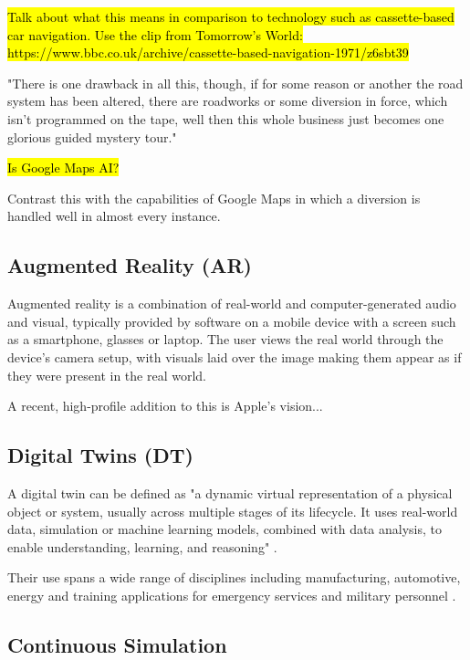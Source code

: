 \documentclass{article}
\begin{document}
\hl{Talk about what this means in comparison to technology such as cassette-based car navigation. Use the clip from Tomorrow's World: https://www.bbc.co.uk/archive/cassette-based-navigation-1971/z6sbt39}

"There is one drawback in all this, though, if for some reason or another the road system has been altered, there are roadworks or some diversion in force, which isn't programmed on the tape, well then this whole business just becomes one glorious guided mystery tour."

\hl{Is Google Maps AI?}

Contrast this with the capabilities of Google Maps in which a diversion is handled well in almost every instance.

\subsection{Augmented Reality (AR)}

Augmented reality is a combination of real-world and computer-generated audio and visual, typically provided by software on a mobile device with a screen such as a smartphone, glasses or laptop. The user views the real world through the device's camera setup, with visuals laid over the image making them appear as if they were present in the real world.

A recent, high-profile addition to this is Apple's vision...


\subsection{Digital Twins (DT)}

A digital twin can be defined as "a dynamic virtual representation of a physical object or system, usually across multiple stages of its lifecycle. It uses real-world data, simulation or machine learning models, combined with data analysis, to enable understanding, learning, and reasoning" \cite{stanford2019digital}. 

Their use spans a wide range of disciplines including manufacturing, automotive, energy \cite{PYLIANIDIS2021105942}
 and training applications for emergency services \cite{ScientificReports1} and military personnel \cite{9345490}. 

\subsection{Continuous Simulation}
\end{document}
